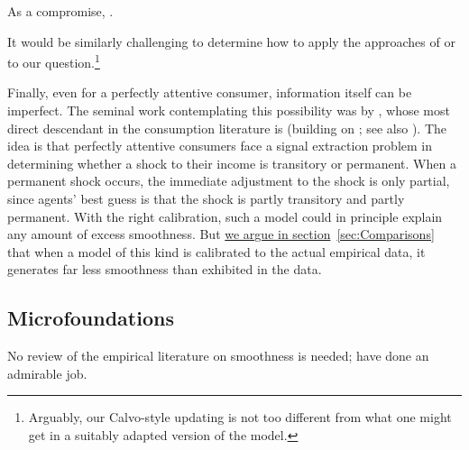 \hypertarget{Gabaix}{}
As a compromise, .

 It would be similarly challenging to determine how to apply the approaches of \cite{woodfordImperfect} or \cite{msInertiaAER} to our question.\footnote{Arguably, our Calvo-style updating is not too different from what one might get in a suitably adapted version of the \cite{msInertiaAER} model.}

Finally, even for a perfectly attentive consumer, information itself can be imperfect.  The seminal work contemplating this possibility was by \cite{muthOptimal}, whose most direct descendant in the consumption literature is \cite{pischkeMicroMacro} (building on \cite{lucas:imperfectInfo}; see also \cite{ludvigson&michaelides:excesses}).  The idea is that perfectly attentive consumers face a signal extraction problem in determining whether a shock to their income is transitory or permanent.  When a permanent shock occurs, the immediate adjustment to the shock is only partial, since agents' best guess is that the shock is partly transitory and partly permanent.   With the right calibration, such a model could in principle explain any amount of excess smoothness.  But \hyperlink{MuthLucasPischke}{we argue in section}~\ref{sec:Comparisons} that when a model of this kind is calibrated to the actual empirical data, it generates far less smoothness than exhibited in the data.

\hypertarget{Microfoundations: Empirical and Theoretical}{}
\subsection{Microfoundations}

No review of the empirical literature on smoothness is needed; \cite{hrsHabit} have done an admirable job.

